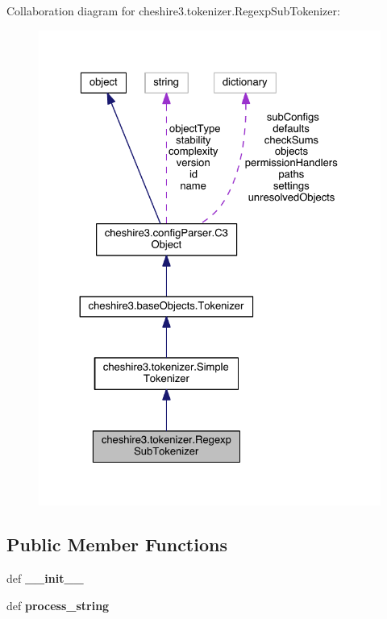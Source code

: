 Collaboration diagram for cheshire3.\-tokenizer.\-Regexp\-Sub\-Tokenizer\-:
\nopagebreak
\begin{figure}[H]
\begin{center}
\leavevmode
\includegraphics[width=326pt]{classcheshire3_1_1tokenizer_1_1_regexp_sub_tokenizer__coll__graph}
\end{center}
\end{figure}
\subsection*{Public Member Functions}
\begin{DoxyCompactItemize}
\item 
\hypertarget{classcheshire3_1_1tokenizer_1_1_regexp_sub_tokenizer_af15e39a951edf885dab3a0667c0b08c7}{def {\bfseries \-\_\-\-\_\-init\-\_\-\-\_\-}}\label{classcheshire3_1_1tokenizer_1_1_regexp_sub_tokenizer_af15e39a951edf885dab3a0667c0b08c7}

\item 
\hypertarget{classcheshire3_1_1tokenizer_1_1_regexp_sub_tokenizer_ad1459bf046cce7d373bbdb2e37daef1d}{def {\bfseries process\-\_\-string}}\label{classcheshire3_1_1tokenizer_1_1_regexp_sub_tokenizer_ad1459bf046cce7d373bbdb2e37daef1d}

\end{DoxyCompactItemize}
